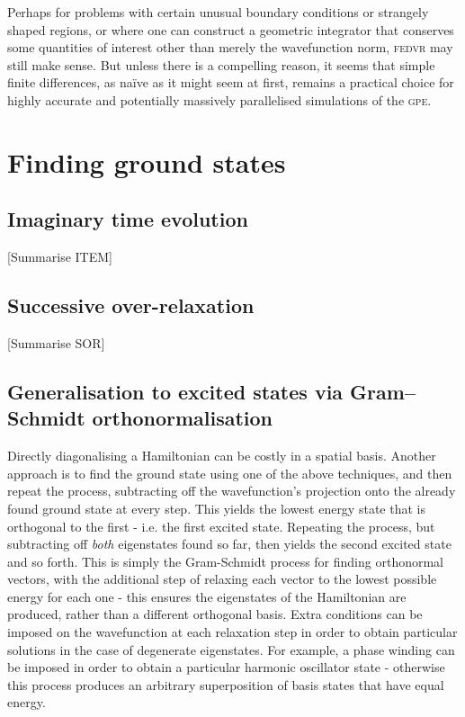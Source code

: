 Perhaps for problems with certain unusual boundary conditions or strangely shaped regions, or where one can construct a geometric integrator that conserves some quantities of interest other than merely the wavefunction norm, \textsc{fedvr} may still make sense. But unless there is a compelling reason, it seems that simple finite differences, as naïve as it might seem at first, remains a practical choice for highly accurate and potentially massively parallelised simulations of the \textsc{gpe}.

\section{Finding ground states}
\subsection{Imaginary time evolution}\label{sec:ITEM}
[Summarise ITEM]
\subsection{Successive over-relaxation}\label{sec:SOR}
[Summarise SOR]
\subsection{Generalisation to excited states via Gram–Schmidt orthonormalisation}
Directly diagonalising a Hamiltonian can be costly in a spatial basis. Another approach is to find the ground state using one of the above techniques, and then repeat the process, subtracting off the wavefunction's projection onto the already found ground state at every step. This yields the lowest energy state that is orthogonal to the first - i.e. the first excited state. Repeating the process, but subtracting off \emph{both} eigenstates found so far, then yields the second excited state and so forth. This is simply the Gram-Schmidt process for finding orthonormal vectors, with the additional step of relaxing each vector to the lowest possible energy for each one - this ensures the eigenstates of the Hamiltonian are produced, rather than a different orthogonal basis. Extra conditions can be imposed on the wavefunction at each relaxation step in order to obtain particular solutions in the case of degenerate eigenstates. For example, a phase winding can be imposed in order to obtain a particular harmonic oscillator state - otherwise this process produces an arbitrary superposition of basis states that have equal energy.

